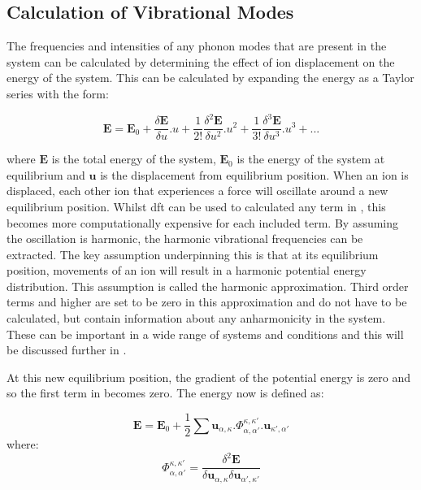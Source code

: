 \subsection{Calculation of Vibrational Modes}
\label{subsec:vibmodestheory}
The frequencies and intensities of any phonon modes that are present in the system can be calculated by determining the effect of ion displacement on the energy of the system. This can be calculated by expanding the energy as a Taylor series with the form:

\begin{equation}
\boldsymbol{E} = \boldsymbol{E}_0 + \frac{\delta \boldsymbol{E}}{\delta u}.u + \frac{1}{2!} \frac{\delta^2 \boldsymbol{E}}{\delta u^2}.u^2 + \frac{1}{3!} \frac{\delta^3 \boldsymbol{E}}{\delta u^3}.u^3 + ...
\label{eqn:ETaylor}
\end{equation}

where \(\boldsymbol{E}\) is the total energy of the system, \(\boldsymbol{E}_0\) is the energy of the system at equilibrium  and \(\boldsymbol{u}\) is the displacement from equilibrium position. When an ion is displaced, each other ion that experiences a force will oscillate around a new equilibrium position. Whilst \acrshort{dft} can be used to calculated any term in , this becomes more computationally expensive for each included term. By assuming the oscillation is harmonic, the harmonic vibrational frequencies can be extracted. The key assumption underpinning this is that at its equilibrium position, movements of an ion will result in a harmonic potential energy distribution. This assumption is called the harmonic approximation. Third order terms and higher are set to be zero in this approximation and do not have to be calculated, but contain information about any anharmonicity in the system. These can be important in a wide range of systems and conditions and this will be discussed further in . 

At this new equilibrium position, the gradient of the potential energy is zero and so the first term in  becomes zero. The energy now is defined as:

\begin{equation}
\boldsymbol{E} = \boldsymbol{E}_0 + \frac{1}{2} \sum \boldsymbol{u}_{\alpha, \kappa}.\Phi_{\alpha, \alpha'}^{\kappa, \kappa'}.\boldsymbol{u}_{\kappa', \alpha'}
\end{equation}
where:
\begin{equation}
\Phi_{\alpha, \alpha'}^{\kappa, \kappa'} =  \frac{\delta^2 \boldsymbol{E}}{\delta \boldsymbol{u}_{\alpha, \kappa} \delta \boldsymbol{u}_{\alpha', \kappa'}}
\end{equation}

